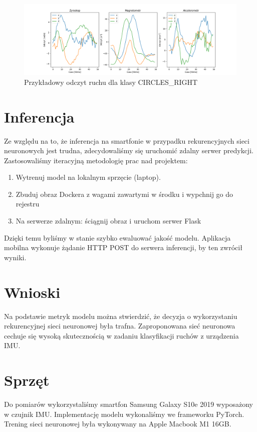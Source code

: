 \documentclass[10pt]{article}
\begin{document}
\begin{figure}[H]
  \includegraphics[width=16cm]{sample.png}
  \centering
  \caption{Przykładowy odczyt ruchu dla klasy CIRCLES\_RIGHT}
\end{figure}

\section{Inferencja}

Ze względu na to, że inferencja na smartfonie w przypadku rekurencyjnych sieci neuronowych jest trudna, zdecydowaliśmy się uruchomić zdalny serwer predykcji. Zastosowaliśmy iteracyjną metodologię prac nad projektem: 

\begin{enumerate}
  \item Wytrenuj model na lokalnym sprzęcie (laptop).
  \item Zbuduj obraz Dockera z wagami zawartymi w środku i wypchnij go do rejestru
  \item Na serwerze zdalnym: ściągnij obraz i uruchom serwer Flask
\end{enumerate}

Dzięki temu byliśmy w stanie szybko ewaluować jakość modelu. Aplikacja mobilna wykonuje żądanie HTTP POST do serwera inferencji, by ten zwrócił wyniki.

\section{Wnioski}

Na podstawie metryk modelu można stwierdzić, że decyzja o wykorzystaniu rekurencyjnej sieci neuronowej była trafna. Zaproponowana sieć neuronowa cechuje się wysoką skutecznością w zadaniu klasyfikacji ruchów z urządzenia IMU.

\section{Sprzęt}

Do pomiarów wykorzystaliśmy smartfon Samsung Galaxy S10e 2019 wyposażony w czujnik IMU. Implementację modelu wykonaliśmy we frameworku PyTorch. Trening sieci neuronowej była wykonywany na Apple Macbook M1 16GB.
\end{document}
